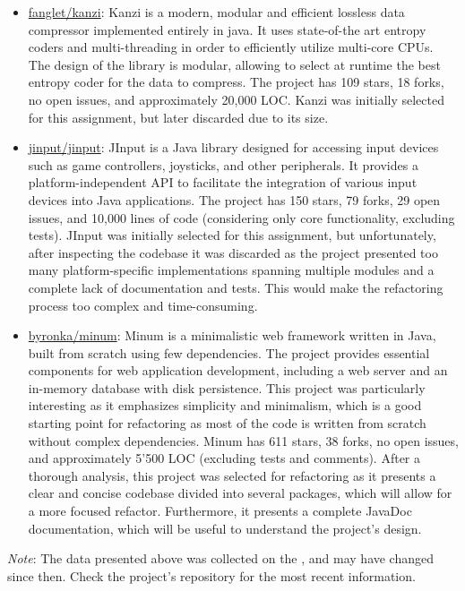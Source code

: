 \begin{itemize}
	\item \href{https://github.com/flanglet/kanzi}{fanglet/kanzi}: Kanzi is a modern, modular and efficient lossless data compressor implemented entirely in java. It uses state-of-the art entropy coders and multi-threading in order to efficiently utilize multi-core CPUs. The design of the library is modular, allowing to select at runtime the best entropy coder for the data to compress. The project has 109 stars, 18 forks, no open issues, and approximately 20,000 LOC. Kanzi was initially selected for this assignment, but later discarded due to its size.
	\item \href{https://github.com/jinput/jinput}{jinput/jinput}: JInput is a Java library designed for accessing input devices such as game controllers, joysticks, and other peripherals. It provides a platform-independent API to facilitate the integration of various input devices into Java applications. The project has 150 stars, 79 forks, 29 open issues, and 10,000 lines of code (considering only core functionality, excluding tests). JInput was initially selected for this assignment, but unfortunately, after inspecting the codebase it was discarded as the project presented too many platform-specific implementations spanning multiple modules and a complete lack of documentation and tests. This would make the refactoring process too complex and time-consuming.
	\item \href{https://github.com/byronka/minum}{byronka/minum}: Minum is a minimalistic web framework written in Java, built from scratch using few dependencies. The project provides essential components for web application development, including a web server and an in-memory database with disk persistence. This project was particularly interesting as it emphasizes simplicity and minimalism, which is a good starting point for refactoring as most of the code is written from scratch without complex dependencies. Minum has 611 stars, 38 forks, no open issues, and approximately 5'500 LOC (excluding tests and comments). After a thorough analysis, this project was selected for refactoring as it presents a clear and concise codebase divided into several packages, which will allow for a more focused refactor. Furthermore, it presents a complete JavaDoc documentation, which will be useful to understand the project's design.
\end{itemize}

\noindent \textit{Note}: The data presented above was collected on the , and may have changed since then. Check the project's repository for the most recent information.

